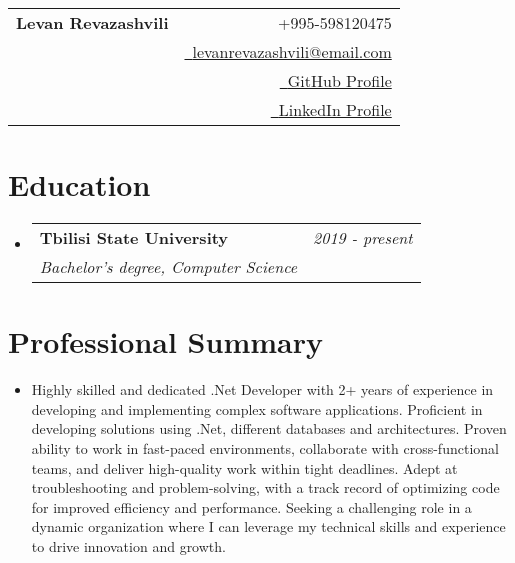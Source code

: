 \documentclass[a4paper,11pt]{article}
\makeatletter
\newcommand{\resumeSubheading}[4]{
\vspace{0.5mm}\item
    \begin{tabular*}{0.98\textwidth}[t]{l@{\extracolsep{\fill}}r}
        \textbf{#1} & \textit{\footnotesize{#4}} \\
        \textit{\footnotesize{#3}} &  \footnotesize{#2}\\
    \end{tabular*}
    \vspace{-2.4mm}
}
\newcommand{\resumeSubHeadingListStart}{\begin{itemize}[leftmargin=*,labelsep=0mm]}
\newcommand{\resumeSubHeadingListEnd}{\end{itemize}\vspace{2mm}}
\newcommand{\newpara}
    {
    \vskip 1cm
    }
\newcommand{\name}{Levan Revazashvili} %
\newcommand{\phone}{598120475} %
\newcommand{\emaila}{levanrevazashvili@email.com} %
\makeatother
\begin{document}
\selectfont

\parbox{\dimexpr\linewidth-0.3cm\relax}{
\begin{tabularx}{\linewidth}{L r} \\
  \textbf{\Large \name} & {\raisebox{0.0\height}{\footnotesize \faPhone}\ +995-\phone}\\
    & \href{mailto:\emaila}{\raisebox{0.0\height}{\footnotesize \faEnvelope}\ {\emaila}} \\
  & \href{https://github.com/Revazashvili}{\raisebox{0.0\height}{\footnotesize \faGithub}\ {GitHub Profile}} \\
  & \href{https://www.linkedin.com/in/revazashvili}{\raisebox{0.0\height}{\footnotesize \faLinkedin}\ {LinkedIn Profile}}
\end{tabularx}
}

\newpara

\section{\textbf{Education}}
  \resumeSubHeadingListStart
    \resumeSubheading
      {Tbilisi State University} \
      {Bachelor's degree, Computer Science}{2019 - present}
  \resumeSubHeadingListEnd
\vspace{-5.5mm}
%

\newpara

\section{\textbf{Professional Summary}}
  \begin{itemize}[leftmargin=0.05in, label={}]
    \item{
      Highly skilled and dedicated .Net Developer with 2+ years of experience in developing and implementing complex software applications. Proficient in developing solutions using .Net, different databases and architectures. Proven ability to work in fast-paced environments, collaborate with cross-functional teams, and deliver high-quality work within tight deadlines. Adept at troubleshooting and problem-solving, with a track record of optimizing code for improved efficiency and performance. Seeking a challenging role in a dynamic organization where I can leverage my technical skills and experience to drive innovation and growth.
    }
 \end{itemize}
\vspace{-5.5mm}
%
\end{document}
